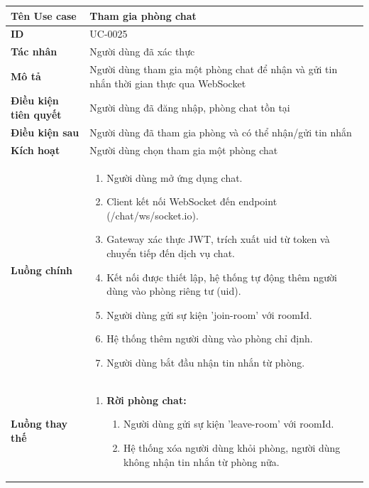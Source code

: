 {
\small
\renewcommand{\arraystretch}{1.15}

\begin{tabularx}{\textwidth}{|>{\raggedright\arraybackslash}p{3.5cm}|>{\raggedright\arraybackslash}X|}
\hline
\textbf{Tên Use case} & Tham gia phòng chat \\
\hline
\textbf{ID} & UC-0025 \\
\hline
\textbf{Tác nhân} & Người dùng đã xác thực \\
\hline
\textbf{Mô tả} & Người dùng tham gia một phòng chat để nhận và gửi tin nhắn thời gian thực qua WebSocket \\
\hline
\textbf{Điều kiện tiên quyết} & Người dùng đã đăng nhập, phòng chat tồn tại \\
\hline
\textbf{Điều kiện sau} & Người dùng đã tham gia phòng và có thể nhận/gửi tin nhắn \\
\hline
\textbf{Kích hoạt} & Người dùng chọn tham gia một phòng chat \\
\hline
\textbf{Luồng chính} &
\begin{enumerate}
    \item Người dùng mở ứng dụng chat.
    \item Client kết nối WebSocket đến endpoint (/chat/ws/socket.io).
    \item Gateway xác thực JWT, trích xuất uid từ token và chuyển tiếp đến dịch vụ chat.
    \item Kết nối được thiết lập, hệ thống tự động thêm người dùng vào phòng riêng tư (uid).
    \item Người dùng gửi sự kiện 'join-room' với roomId.
    \item Hệ thống thêm người dùng vào phòng chỉ định.
    \item Người dùng bắt đầu nhận tin nhắn từ phòng.
\end{enumerate} \\
\hline
\textbf{Luồng thay thế} &
\begin{enumerate}
    \item \textbf{Rời phòng chat:}
    \begin{enumerate}
        \item[7A.] Người dùng gửi sự kiện 'leave-room' với roomId.
        \item[8A.] Hệ thống xóa người dùng khỏi phòng, người dùng không nhận tin nhắn từ phòng nữa.
    \end{enumerate}
\end{enumerate} \\

\end{tabularx}}
